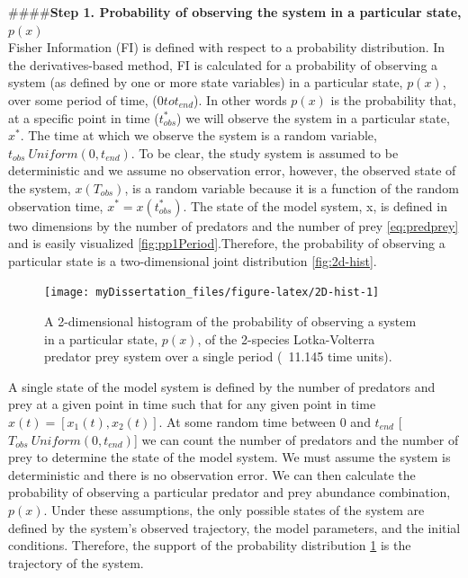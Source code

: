 \documentclass[12pt,twoside]{reedthesis}
\begin{document}
\#\#\#\#\textbf{Step 1. Probability of observing the system in a particular state, \(p(x)\)}\\
Fisher Information (FI) is defined with respect to a probability distribution. In the derivatives-based method, FI is calculated for a probability of observing a system (as defined by one or more state variables) in a particular state, \(p(x)\), over some period of time, (\(0 to t_{end}\)). In other words \(p(x)\) is the probability that, at a specific point in time (\(t_{obs}^*\)) we will observe the system in a particular state, \(x^*\). The time at which we observe the system is a random variable, \(t_{obs} ~ Uniform(0,t_{end})\). To be clear, the study system is assumed to be deterministic and we assume no observation error, however, the observed state of the system, \(x(T_{obs})\), is a random variable because it is a function of the random observation time, \(x^*= x(t_{obs}^*)\). The state of the model system, x, is defined in two dimensions by the number of predators and the number of prey \eqref{eq:predprey} and is easily visualized \ref{fig:pp1Period}.Therefore, the probability of observing a particular state is a two-dimensional joint distribution \ref{fig:2d-hist}.
\begin{figure}

{\centering \texttt{[image: myDissertation\_files/figure-latex/2D-hist-1]} 

}

\caption{A 2-dimensional histogram of the probability of observing a system in a particular state, $p(x)$, of the 2-species Lotka-Volterra predator prey system over a single period (~11.145 time units).}\label{fig:2D-hist}
\end{figure}
A single state of the model system is defined by the number of predators and prey at a given point in time such that for any given point in time \(x(t)=[x_1 (t),x_2 (t)]\). At some random time between 0 and \(t_{end}\) {[}\(T_{obs} ~ Uniform(0,t_{end})\){]} we can count the number of predators and the number of prey to determine the state of the model system. We must assume the system is deterministic and there is no observation error. We can then calculate the probability of observing a particular predator and prey abundance combination, \(p(x)\). Under these assumptions, the only possible states of the system are defined by the system's observed trajectory, the model parameters, and the initial conditions. Therefore, the support of the probability distribution \ref{fig:2D-hist} is the trajectory of the system.
\end{document}
